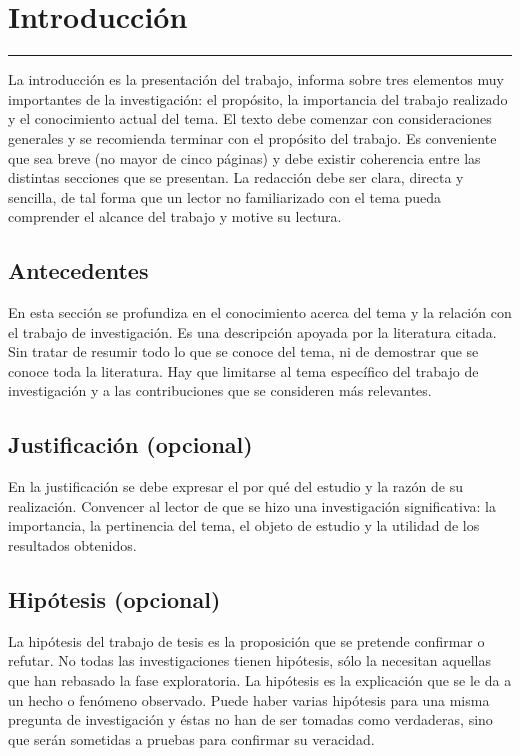 \chapter{Introducci\'on}\label{capit:cap1}
\vspace{-2.0325ex}%
\noindent
\rule{\textwidth}{0.5pt}
\vspace{-5.5ex}%
\newcommand{\pushline}{\Indp}%

La introducción es la presentación del trabajo, informa sobre tres elementos muy importantes de la investigación: el propósito, la importancia del trabajo realizado y el conocimiento actual del tema. El texto debe comenzar con consideraciones generales y se recomienda terminar con el propósito del trabajo. Es conveniente que sea breve (no mayor de cinco páginas) y debe existir coherencia entre las distintas secciones que se presentan. La redacción debe ser clara, directa y sencilla, de tal forma que un lector no familiarizado con el tema pueda comprender el alcance del trabajo y motive su lectura.

\section{Antecedentes}\label{secc:antece}
En esta sección se profundiza en el conocimiento acerca del tema y la relación con el trabajo de investigación. Es una descripción apoyada por la literatura citada. Sin tratar de resumir todo lo que se conoce del tema, ni de demostrar que se conoce toda la literatura. Hay que limitarse al tema específico del trabajo de investigación y a las contribuciones que se consideren más relevantes.
\citep{CorderoEsquivel1988}
\section{Justificaci\'on (opcional)}\label{secc:jus}

En la justificación se debe expresar el por qué del estudio y la razón de su realización. Convencer al lector de que se hizo una investigación significativa: la importancia, la pertinencia del tema, el objeto de estudio y la utilidad de los resultados obtenidos.

\section{Hip\'otesis (opcional)}\label{secc:hipot}
La hipótesis del trabajo de tesis es la proposición que se pretende confirmar o refutar. No todas las investigaciones tienen hipótesis, sólo la necesitan aquellas que han rebasado la fase exploratoria. La hipótesis es la explicación que se le da a un hecho o fenómeno observado. Puede haber varias hipótesis para una misma pregunta de investigación y éstas no han de ser tomadas como verdaderas, sino que serán sometidas a pruebas para confirmar su veracidad.


